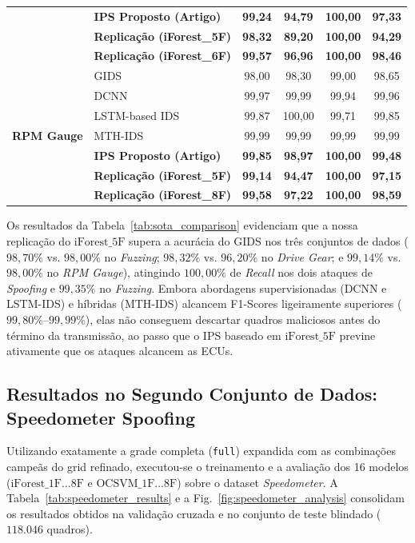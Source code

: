 \documentclass[conference]{IEEEtran}
\begin{document}
\begin{table}[htbp]
\begin{tabular}{llcccc}
 & \textbf{IPS Proposto (Artigo)} & \textbf{99,24} & \textbf{94,79} & \textbf{100,00} & \textbf{97,33} \\
 & \textbf{Replicação (iForest\_5F)} & \textbf{98,32} & \textbf{89,20} & \textbf{100,00} & \textbf{94,29} \\
 & \textbf{Replicação (iForest\_6F)} & \textbf{99,57} & \textbf{96,96} & \textbf{100,00} & \textbf{98,46} \\
\midrule
\multirow{7}{*}{\textbf{RPM Gauge}} 
 & GIDS \cite{seo2018gids} & 98,00 & 98,30 & 99,00 & 98,65 \\
 & DCNN \cite{song2020invehicle} & 99,97 & 99,99 & 99,94 & 99,96 \\
 & LSTM-based IDS \cite{song2020invehicle} & 99,87 & 100,00 & 99,71 & 99,85 \\
 & MTH-IDS \cite{yang2021mth} & 99,99 & 99,99 & 99,99 & 99,99 \\
 & \textbf{IPS Proposto (Artigo)} & \textbf{99,85} & \textbf{98,97} & \textbf{100,00} & \textbf{99,48} \\
 & \textbf{Replicação (iForest\_5F)} & \textbf{99,14} & \textbf{94,47} & \textbf{100,00} & \textbf{97,15} \\
 & \textbf{Replicação (iForest\_8F)} & \textbf{99,58} & \textbf{97,22} & \textbf{100,00} & \textbf{98,59} \\
\bottomrule
\end{tabular}
\end{table}

Os resultados da Tabela~\ref{tab:sota_comparison} evidenciam que a nossa replicação do $\text{iForest\_5F}$ supera a acurácia do GIDS nos três conjuntos de dados ($98{,}70\%$ vs. $98{,}00\%$ no \textit{Fuzzing}; $98{,}32\%$ vs. $96{,}20\%$ no \textit{Drive Gear}; e $99{,}14\%$ vs. $98{,}00\%$ no \textit{RPM Gauge}), atingindo $100{,}00\%$ de \textit{Recall} nos dois ataques de \textit{Spoofing} e $99{,}35\%$ no \textit{Fuzzing}. Embora abordagens supervisionadas (DCNN e LSTM-IDS) e híbridas (MTH-IDS) alcancem F1-Scores ligeiramente superiores ($99{,}80\%\text{--}99{,}99\%$), elas não conseguem descartar quadros maliciosos antes do término da transmissão, ao passo que o IPS baseado em $\text{iForest\_5F}$ previne ativamente que os ataques alcancem as ECUs.

\subsection{Resultados no Segundo Conjunto de Dados: Speedometer Spoofing}
Utilizando exatamente a grade completa (\texttt{full}) expandida com as combinações campeãs do grid refinado, executou-se o treinamento e a avaliação dos 16 modelos ($\text{iForest\_1F}\dots\text{8F}$ e $\text{OCSVM\_1F}\dots\text{8F}$) sobre o dataset \textit{Speedometer}. A Tabela~\ref{tab:speedometer_results} e a Fig.~\ref{fig:speedometer_analysis} consolidam os resultados obtidos na validação cruzada e no conjunto de teste blindado ($118.046$ quadros).
\end{document}
